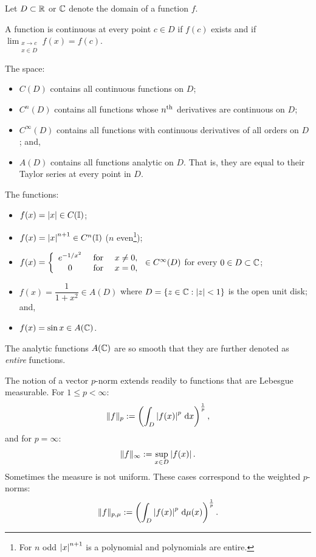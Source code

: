 Let $D\subset\mathbb{R}$ or $\mathbb{C}$ denote the domain of a function $f$. 

\begin{definition}
A function is continuous at every point $c\in D$ if $f(c)$ exists and if $\displaystyle\lim_{\substack{x\to c \\ x \in D}}f(x) = f(c)$. \end{definition}

\begin{definition} The space:
\begin{itemize}
\item $C(D)$ contains all continuous functions on $D$;
\item $C^n(D)$ contains all functions whose $n^{\rm th}$ derivatives are continuous on $D$;
\item $C^\infty(D)$ contains all functions with continuous derivatives of all orders on $D$; and,
\item $A(D)$ contains all functions analytic on $D$. That is, they are equal to their Taylor series at every point in $D$.
\end{itemize}
\end{definition}

\begin{example}
The functions:
\begin{itemize}
\item $f(x) = \left|{x}\right| \in C(\mathbb{I})$;
\item $f(x) = \left|{x}\right|^{n+1}\in C^n(\mathbb{I})$ ($n$ even\footnote{For $n$ odd $\left|{x}\right|^{n+1}$ is a polynomial and polynomials are entire.});
\item $f(x) = \left\{\begin{array}{ccc} e^{-1/x^2} & \hbox{ for } & x\ne 0,\\0 & \hbox{ for } & x = 0,\end{array}\right.\in C^\infty(D)$ for every $0\in D\subset\mathbb{C}$;
\item $f(x) = \dfrac{1}{1+x^2} \in A(D)$ where $D = \{z\in\mathbb{C}:\left|{z}\right|<1\}$ is the open unit disk; and,
\item $f(x) = \sin x\in A(\mathbb{C})$.
\end{itemize}
\end{example}

The analytic functions $A(\mathbb{C})$ are so smooth that they are further denoted as {\em entire} functions.

The notion of a vector $p$-norm extends readily to functions that are Lebesgue measurable. For $1\le p < \infty$:
\begin{equation}
\|f\|_p := \left(\int_D\left|{f(x)}\right|^p{\rm\,d} x\right)^{\frac{1}{p}},
\end{equation}
and for $p=\infty$:
\begin{equation}
\|f\|_\infty := \sup_{x\in D} \left|{f(x)}\right|.
\end{equation}
Sometimes the measure is not uniform. These cases correspond to the weighted $p$-norms:
\begin{equation}
\|f\|_{p,\mu} := \left(\int_D\left|{f(x)}\right|^p{\rm\,d}\mu(x)\right)^{\frac{1}{p}}.
\end{equation}

